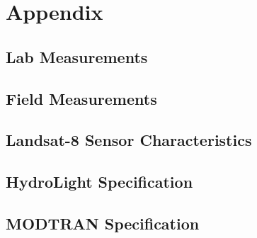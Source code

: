 \appendix
\chapter*{Appendix}
\section{Lab Measurements}
\section{Field Measurements}
\section{Landsat-8 Sensor Characteristics}
\section{HydroLight Specification}
\section{MODTRAN Specification}